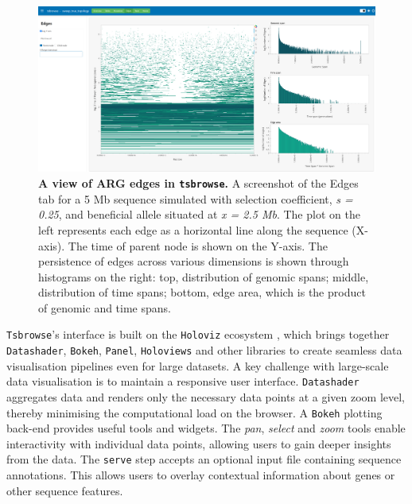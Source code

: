 \documentclass[unnumsec,webpdf,contemporary,large,namedate]{oup-authoring-template}%
\begin{document}
\begin{figure}
    \centering
    \includegraphics[width=0.95\linewidth]{figures/MainFig2.png}
    \caption{\textbf{A view of ARG edges in \texttt{tsbrowse}.}
    A screenshot of the Edges tab for a 5 Mb sequence simulated with selection coefficient, \textit{s = 0.25}, and beneficial allele situated at \textit{x = 2.5 Mb}. The plot on the left represents each edge as a horizontal line along the sequence (X-axis). The time of parent node is shown on the Y-axis. The persistence of edges across various dimensions is shown through histograms on the right: top, distribution of genomic spans; middle, distribution of time spans; bottom, edge area, which is the product of genomic and time spans.} 

    \label{fig:Figure_2}
\end{figure}

\texttt{Tsbrowse}'s interface is built on the \texttt{Holoviz} ecosystem
\citep{Holoviz}, which brings together \texttt{Datashader}, \texttt{Bokeh},
\texttt{Panel}, \texttt{Holoviews} and other libraries to create seamless data
visualisation pipelines even for large datasets. A key challenge with
large-scale data visualisation is to maintain a responsive user interface.
\texttt{Datashader} aggregates data and renders only the necessary data points
at a given zoom level, thereby minimising the computational load on the
browser. A \texttt{Bokeh} plotting back-end provides useful tools and widgets.
The \textit{pan}, \textit{select} and \textit{zoom} tools enable interactivity
with individual data points, allowing users to gain deeper insights from the
data. The \texttt{serve} step accepts an optional input file containing
sequence annotations. This allows users to overlay contextual information about
genes or other sequence features. 
\end{document}
